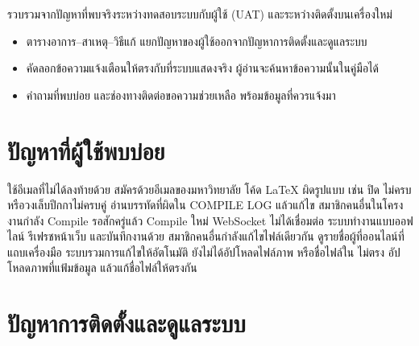 \label{ch:trouble}

\begin{guide}
รวบรวมจากปัญหาที่พบจริงระหว่างทดสอบระบบกับผู้ใช้ (UAT) และระหว่างติดตั้งบนเครื่องใหม่
\begin{itemize}
  \item ตารางอาการ--สาเหตุ--วิธีแก้ แยกปัญหาของผู้ใช้ออกจากปัญหาการติดตั้งและดูแลระบบ
  \item คัดลอกข้อความแจ้งเตือนให้ตรงกับที่ระบบแสดงจริง ผู้อ่านจะค้นหาข้อความนั้นในคู่มือได้
  \item คำถามที่พบบ่อย และช่องทางติดต่อขอความช่วยเหลือ พร้อมข้อมูลที่ควรแจ้งมา
\end{itemize}
\end{guide}

\section{ปัญหาที่ผู้ใช้พบบ่อย}

\begin{troubleshooting}
        {ใช้อีเมลที่ไม่ได้ลงท้ายด้วย }
        {สมัครด้วยอีเมลของมหาวิทยาลัย}
        {โค้ด \LaTeX{} ผิดรูปแบบ เช่น ปิด \cmd{\begin{...}} ไม่ครบ หรือวงเล็บปีกกาไม่ครบคู่}
        {อ่านบรรทัดที่ผิดใน COMPILE LOG แล้วแก้ไข}
        {สมาชิกคนอื่นในโครงงานกำลัง Compile}
        {รอสักครู่แล้ว Compile ใหม่}
        {WebSocket ไม่ได้เชื่อมต่อ ระบบทำงานแบบออฟไลน์}
        {รีเฟรชหน้าเว็บ และบันทึกงานด้วย }
        {สมาชิกคนอื่นกำลังแก้ไขไฟล์เดียวกัน}
        {ดูรายชื่อผู้ที่ออนไลน์ที่แถบเครื่องมือ ระบบรวมการแก้ไขให้อัตโนมัติ}
        {ยังไม่ได้อัปโหลดไฟล์ภาพ หรือชื่อไฟล์ใน  ไม่ตรง}
        {อัปโหลดภาพที่แฟ้มข้อมูล แล้วแก้ชื่อไฟล์ให้ตรงกัน}
\end{troubleshooting}

\section{ปัญหาการติดตั้งและดูแลระบบ}

